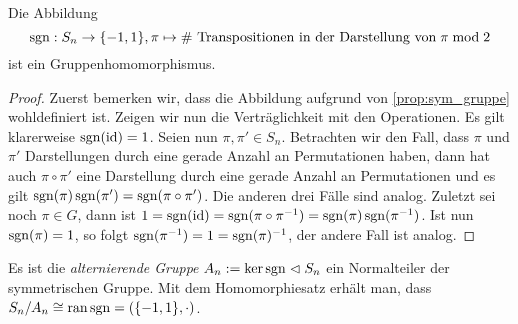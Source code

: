 \begin{corollary}
    Die Abbildung $$\operatorname{sgn}: S_n \to \{-1,1\}, \pi \mapsto \text{\# Transpositionen in der Darstellung von}\;\pi\;\text{mod}\; 2$$ ist ein Gruppenhomomorphismus.
\end{corollary}
\begin{proof}
    Zuerst bemerken wir, dass die Abbildung aufgrund von \cref{prop:sym_gruppe} wohldefiniert ist. Zeigen wir nun die Verträglichkeit mit den Operationen. Es gilt klarerweise $\operatorname{sgn}(\operatorname{id}) = 1$. Seien nun $\pi, \pi' \in S_n$. Betrachten wir den Fall, dass $\pi$ und $\pi'$ Darstellungen durch eine gerade Anzahl an Permutationen haben, dann hat auch $\pi \circ \pi'$ eine Darstellung durch eine gerade Anzahl an Permutationen und es gilt $\operatorname{sgn}(\pi)\operatorname{sgn}(\pi') = \operatorname{sgn}(\pi \circ \pi')$. Die anderen drei Fälle sind analog. Zuletzt sei noch $\pi \in G$, dann ist $1 = \operatorname{sgn}(\operatorname{id}) = \operatorname{sgn}(\pi \circ \pi^{-1}) = \operatorname{sgn}(\pi) \operatorname{sgn}(\pi^{-1})$. Ist nun $\operatorname{sgn}(\pi) = 1$, so folgt $\operatorname{sgn}(\pi^{-1}) = 1 = \operatorname{sgn}(\pi)^{-1}$, der andere Fall ist analog.
\end{proof}

\begin{remark}
    Es ist die \emph{alternierende Gruppe} $A_n := \ker \operatorname{sgn} \vartriangleleft S_n$ ein Normalteiler der symmetrischen Gruppe. Mit dem Homomorphiesatz erhält man, dass $S_n/A_n \cong \operatorname{ran} \operatorname{sgn} = (\{-1,1\}, \cdot)$.
\end{remark}